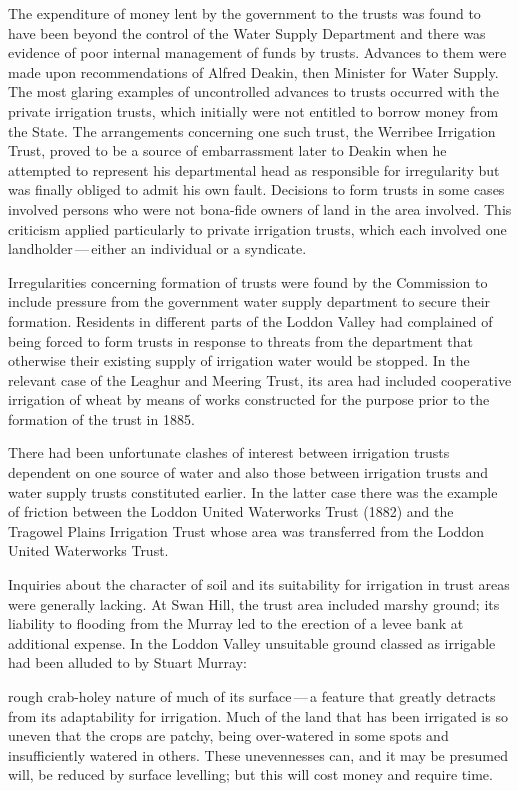 The expenditure of money lent by the government to the trusts was
found to have been beyond the control of the Water Supply Department
and there was evidence of poor internal management of funds by trusts.
Advances to them were made upon recommendations of Alfred Deakin,
  then Minister
for Water Supply.  The most glaring examples of uncontrolled advances
to trusts occurred with the private irrigation trusts, which initially
were not entitled to borrow money from the State.  The arrangements
concerning one such trust, the Werribee Irrigation Trust,
 proved to be
a source of embarrassment later to Deakin when he attempted to
represent his departmental head as responsible for irregularity but
was finally obliged to admit his own fault.  Decisions to form trusts
in some cases involved persons who were not bona-fide owners of land
in the area involved.  This criticism applied particularly to private
irrigation trusts, which each involved one landholder\,---\,either an
individual or a syndicate.

Irregularities concerning formation of trusts were found by the
Commission to include pressure from the government water supply
department to secure their formation.  Residents in different parts of
the Loddon Valley  had complained of being forced
to form trusts in response to threats from the department that
otherwise their existing supply of irrigation water would be stopped.
In the relevant case of the Leaghur and Meering Trust,
 its area had
included cooperative irrigation of wheat by means of works constructed
for the purpose prior to the formation of the trust in 1885.

There had been unfortunate clashes of interest between irrigation
trusts dependent on one source of water and also those between
irrigation trusts and water supply trusts constituted earlier.  In the
latter case there was the example of friction between the Loddon
United Waterworks Trust  (1882)
and the Tragowel Plains Irrigation Trust
 whose area was transferred
from the Loddon United Waterworks Trust.


Inquiries about the character of soil and its suitability for
irrigation in trust areas were generally lacking.  At Swan Hill,
 the
trust area included marshy ground; its liability to flooding from the
Murray led to the erection of a levee bank at additional expense.  In
the Loddon Valley unsuitable ground classed as irrigable had been
alluded to by Stuart Murray: 
\begin{Quote}
	rough crab-holey nature of much of its surface\,---\,a feature
	that greatly detracts from its adaptability for irrigation.
	Much of the land that has been irrigated is so uneven that the
	crops are patchy, being over-watered in some spots and
	insufficiently watered in others.  These unevennesses can, and
	it may be presumed will, be reduced by surface levelling; but
	this will cost money and require time.
\end{Quote}

